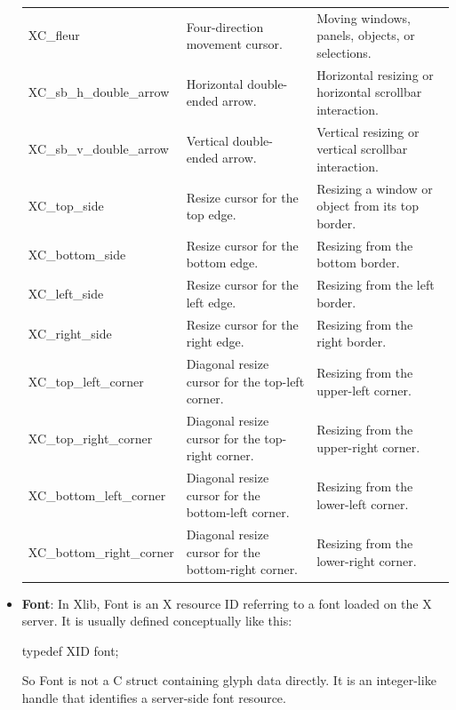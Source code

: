 \documentclass{report}
\begin{document}
\begin{itemize}
\begin{center}
\begin{tabularx}{\textwidth}{@{}lXX@{}}
                        XC\_fleur	&Four-direction movement cursor.	&Moving windows, panels, objects, or selections.\\[2ex]
                        XC\_sb\_h\_double\_arrow	&Horizontal double-ended arrow.	&Horizontal resizing or horizontal scrollbar interaction.\\[2ex]
                        XC\_sb\_v\_double\_arrow	&Vertical double-ended arrow.	&Vertical resizing or vertical scrollbar interaction.\\[2ex]
                        XC\_top\_side	&Resize cursor for the top edge.	&Resizing a window or object from its top border.\\[2ex]
                        XC\_bottom\_side	&Resize cursor for the bottom edge.	&Resizing from the bottom border.\\[2ex]
                        XC\_left\_side	&Resize cursor for the left edge.	&Resizing from the left border.\\[2ex]
                        XC\_right\_side	&Resize cursor for the right edge.	&Resizing from the right border.\\[2ex]
                        XC\_top\_left\_corner&	Diagonal resize cursor for the top-left corner.	&Resizing from the upper-left corner.\\[2ex]
                        XC\_top\_right\_corner&	Diagonal resize cursor for the top-right corner.	&Resizing from the upper-right corner.\\[2ex]
                        XC\_bottom\_left\_corner&	Diagonal resize cursor for the bottom-left corner.	&Resizing from the lower-left corner.\\[2ex]
                        XC\_bottom\_right\_corner&	Diagonal resize cursor for the bottom-right corner.	&Resizing from the lower-right corner. \\
                        \bottomrule
                    \end{tabularx}
                \end{center}
        \item \textbf{Font}: In Xlib, Font is an X resource ID referring to a font loaded on the X server.
            \bigbreak \noindent 
            It is usually defined conceptually like this:
            \bigbreak \noindent 
            \begin{cppcode}
            typedef XID font;
            \end{cppcode}
            \bigbreak \noindent 
            So Font is not a C struct containing glyph data directly. It is an integer-like handle that identifies a server-side font resource.

\end{itemize}
\end{document}
